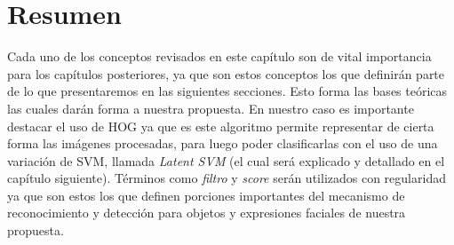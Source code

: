 \section{Resumen}\label{sec:resumen}

Cada uno de los conceptos revisados en este capítulo son de vital importancia para los capítulos posteriores, ya que son estos conceptos los que definirán parte de lo que presentaremos en las siguientes secciones. Esto forma las bases teóricas las cuales darán forma a nuestra propuesta. En nuestro caso es importante destacar el uso de HOG ya que es este algoritmo permite representar de cierta forma las imágenes procesadas, para luego poder clasificarlas con el uso de una variación de SVM, llamada \textit{Latent SVM} (el cual será explicado y detallado en el capítulo siguiente). Términos como \textit{filtro} y \textit{score} serán utilizados con regularidad ya que son estos los que definen porciones importantes del mecanismo de reconocimiento y detección para objetos y expresiones faciales de nuestra propuesta.